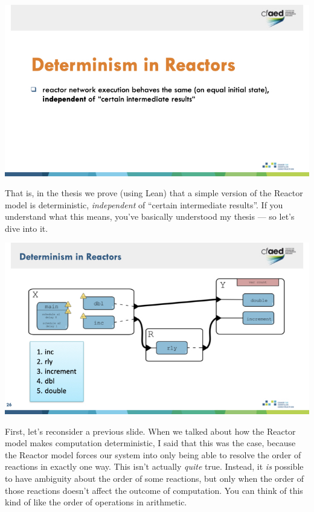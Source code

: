 \documentclass{article}
\begin{document}
\begin{center}
    \includegraphics[width=\columnwidth]{Slides/Slide 25.jpeg}
\end{center}

That is, in the thesis we prove (using Lean) that a simple version of the Reactor model is deterministic, \emph{independent} of ``certain intermediate results''.
If you understand what this means, you've basically understood my thesis --- so let's dive into it.

\begin{center}
    \includegraphics[width=\columnwidth]{Slides/Slide 26.jpeg}
\end{center}

First, let's reconsider a previous slide.
When we talked about how the Reactor model makes computation deterministic, I said that this was the case, because the Reactor model forces our system into only being able to resolve the order of reactions in exactly one way.
This isn't actually \emph{quite} true.
Instead, it \emph{is} possible to have ambiguity about the order of some reactions, but only when the order of those reactions doesn't affect the outcome of computation.
You can think of this kind of like the order of operations in arithmetic.
\end{document}
